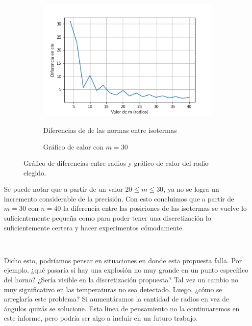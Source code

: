 \begin{figure}[h]
    \centering
    \begin{subfigure}{0.49\linewidth}
        \centering
        \includegraphics[scale=0.49]{img/EXP1/grafico_diferencias.png}
        \label{fig:diferencias}
        \caption{Diferencias de de las normas entre isotermas}
    \end{subfigure}
    \hfill
    \begin{subfigure}{0.49\linewidth}
        \centering
        
        \caption{Gráfico de calor con $m = 30$}
        \label{fig:D1_30_40}
    \end{subfigure}
    \caption{Gráfico de diferencias entre radios y gráfico de calor del radio elegido.}
    \label{fig:modelo_elegido}
\end{figure}

Se puede notar que a partir de un valor $20 \leq m \leq 30$, ya no se logra un incremento considerable de la precisión. Con esto concluimos que a partir de $m = 30$ con $n = 40$ la diferencia entre las posiciones de las isotermas se vuelve lo suficientemente pequeña como para poder tener una discretización lo suficientemente certera y hacer experimentos cómodamente.

\

Dicho esto, podríamos pensar en situaciones en donde esta propuesta falla. Por ejemplo, ¿qué pasaría si hay una explosión no muy grande en un punto específico del horno? ¿Sería visible en la discretización propuesta? Tal vez un cambio no muy significativo en las temperaturas no sea detectado. Luego, ¿cómo se arreglaría este problema? Si aumentáramos la cantidad de radios en vez de ángulos quizás se solucione. Esta línea de pensamiento no la continuaremos en este informe, pero podría ser algo a incluir en un futuro trabajo.


